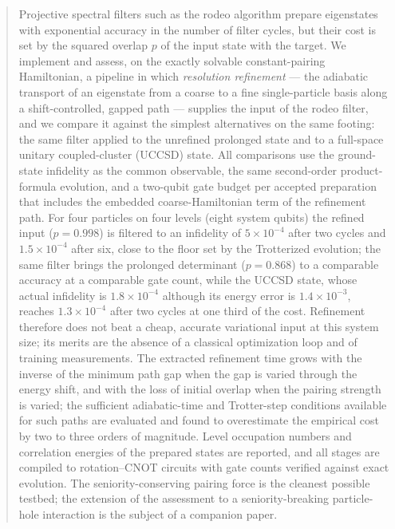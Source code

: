 \documentclass[
  aps,            %
  prc,            %
  reprint,        %
  superscriptaddress,
  floatfix,
  nofootinbib
]{revtex4-2}
\begin{document}
\begin{abstract}
Projective spectral filters such as the rodeo algorithm prepare eigenstates with
exponential accuracy in the number of filter cycles, but their cost is set by
the squared overlap $p$ of the input state with the target.  We implement and
assess, on the exactly solvable constant-pairing Hamiltonian, a pipeline in
which \emph{resolution refinement} --- the adiabatic transport of an eigenstate
from a coarse to a fine single-particle basis along a shift-controlled,
gapped path --- supplies the input of the rodeo filter, and we compare it
against the simplest alternatives on the same footing: the same filter applied
to the unrefined prolonged state and to a full-space unitary coupled-cluster
(UCCSD) state.  All comparisons use the ground-state infidelity as the common
observable, the same second-order product-formula evolution, and a two-qubit
gate budget per accepted preparation that includes the embedded
coarse-Hamiltonian term of the refinement path.  For four particles on four
levels (eight system qubits) the refined input ($p=0.998$) is filtered to an
infidelity of $5\times10^{-4}$ after two cycles and $1.5\times10^{-4}$ after
six, close to the floor set by the Trotterized evolution; the same filter brings
the prolonged determinant ($p=0.868$) to a comparable accuracy at a comparable
gate count, while the UCCSD state, whose actual infidelity is $1.8\times10^{-4}$
although its energy error is $1.4\times10^{-3}$, reaches $1.3\times10^{-4}$
after two cycles at one third of the cost.  Refinement therefore does not
beat a cheap, accurate variational input at this system size; its merits are
the absence of a classical optimization loop and of training measurements.
The extracted refinement time grows with the inverse of the minimum path gap
when the gap is varied through the energy shift, and with the loss of initial
overlap when the pairing strength is varied; the sufficient adiabatic-time and
Trotter-step conditions available for such paths are evaluated and found to
overestimate the empirical cost by two to three orders of magnitude.  Level occupation
numbers and correlation energies of the prepared states are reported, and all
stages are compiled to rotation--CNOT circuits with gate counts verified
against exact evolution.  The seniority-conserving pairing force is the
cleanest possible testbed; the extension of the assessment to a
seniority-breaking particle-hole interaction is the subject of a companion
paper.
\end{abstract}
\end{document}

